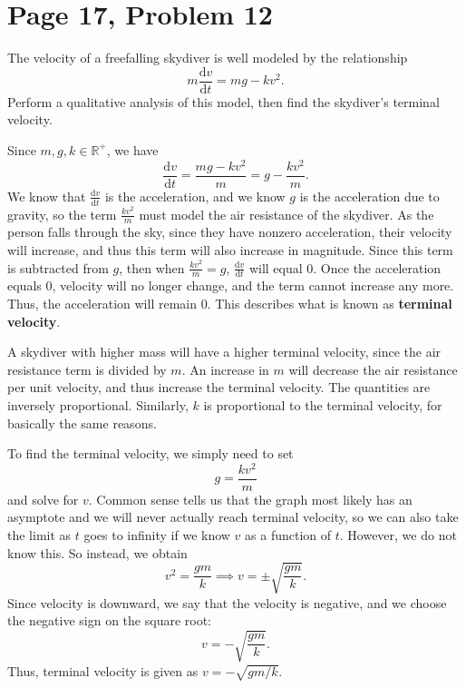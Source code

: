 \documentclass[11pt, letterpaper]{report}
\begin{document}
\section*{Page 17, Problem 12}
The velocity of a freefalling skydiver is well modeled by the relationship
\[
	m \frac{\mathrm{d}v}{\mathrm{d}t} =mg-kv^2
.\]
Perform a qualitative analysis of this model, then find the skydiver's terminal velocity.
\begin{solution}
	Since $m,g,k\in\mathbb{R}^+$, we have
	\[
		\frac{\mathrm{d}v}{\mathrm{d}t} =\frac{mg-kv^2}{m}=g-\frac{kv^2}{m}	
	.\]
We know that $\frac{\mathrm{d}v}{\mathrm{d}t} $ is the acceleration, and we know $g$ is the acceleration due to gravity, so the term $\frac{kv^2}{m}$ must model the air resistance of the skydiver. As the person falls through the sky, since they have nonzero acceleration, their velocity will increase, and thus this term will also increase in magnitude. Since this term is subtracted from $g$, then when $\frac{kv^2}{m}=g$, $\frac{\mathrm{d}v}{\mathrm{d}t} $ will equal $0$. Once the acceleration equals $0$, velocity will no longer change, and the term cannot increase any more. Thus, the acceleration will remain $0$. This describes what is known as \textbf{terminal} \textbf{velocity}.

A skydiver with higher mass will have a higher terminal velocity, since  the air resistance term is divided by  $m$. An increase in $ m$ will decrease the air resistance per unit velocity, and thus increase the terminal velocity. The quantities are inversely proportional. Similarly, $k$ is proportional to the terminal velocity, for basically the same reasons.

To find the terminal velocity, we simply need to set
\[g=\frac{kv^2}{m}\]
and solve for $v$. Common sense tells us that the graph most likely has an asymptote and we will never actually reach terminal velocity, so we can also take the limit as $t$ goes to infinity if we know $v$ as a function of $t$. However, we do not know this. So instead, we obtain
\[
	v^2 = \frac{gm}{k}\implies v=\pm \sqrt{\frac{gm}{k}} 
.\]
Since velocity is downward, we say that the velocity is negative, and we choose the negative sign on the square root:
\[
	v=-\sqrt{\frac{gm}{k}} 
.\]
Thus, terminal velocity is given as $v=-\sqrt{gm/k} $.
\end{solution}
\end{document}
